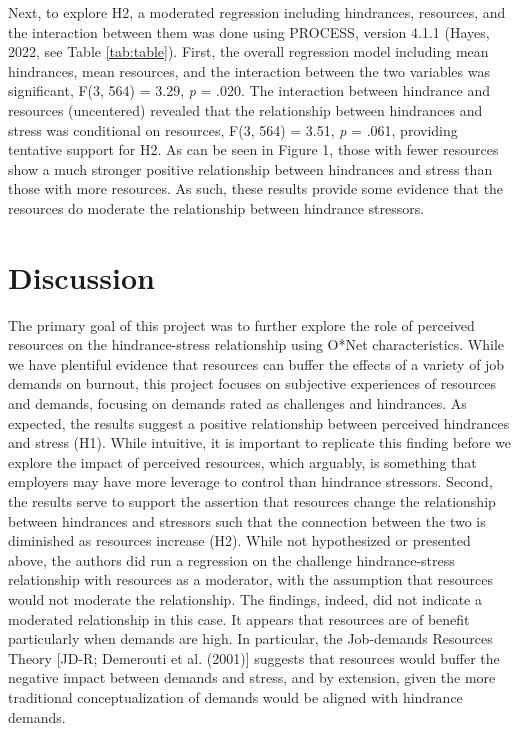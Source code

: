 \documentclass[
  english,
  man]{apa6}
\begin{document}
Next, to explore H2, a moderated regression including hindrances, resources, and the interaction between them was done using PROCESS, version 4.1.1 (Hayes, 2022, see Table \ref{tab:table}). First, the overall regression model including mean hindrances, mean resources, and the interaction between the two variables was significant, F(3, 564) = 3.29, \emph{p} = .020. The interaction between hindrance and resources (uncentered) revealed that the relationship between hindrances and stress was conditional on resources, F(3, 564) = 3.51, \emph{p} = .061, providing tentative support for H2. As can be seen in Figure 1, those with fewer resources show a much stronger positive relationship between hindrances and stress than those with more resources. As such, these results provide some evidence that the resources do moderate the relationship between hindrance stressors.

\hypertarget{discussion}{%
\section{Discussion}\label{discussion}}

The primary goal of this project was to further explore the role of perceived resources on the hindrance-stress relationship using O*Net characteristics. While we have plentiful evidence that resources can buffer the effects of a variety of job demands on burnout, this project focuses on subjective experiences of resources and demands, focusing on demands rated as challenges and hindrances. As expected, the results suggest a positive relationship between perceived hindrances and stress (H1). While intuitive, it is important to replicate this finding before we explore the impact of perceived resources, which arguably, is something that employers may have more leverage to control than hindrance stressors. Second, the results serve to support the assertion that resources change the relationship between hindrances and stressors such that the connection between the two is diminished as resources increase (H2). While not hypothesized or presented above, the authors did run a regression on the challenge hindrance-stress relationship with resources as a moderator, with the assumption that resources would not moderate the relationship. The findings, indeed, did not indicate a moderated relationship in this case. It appears that resources are of benefit particularly when demands are high. In particular, the Job-demands Resources Theory {[}JD-R; Demerouti et al. (2001){]} suggests that resources would buffer the negative impact between demands and stress, and by extension, given the more traditional conceptualization of demands would be aligned with hindrance demands.
\end{document}
